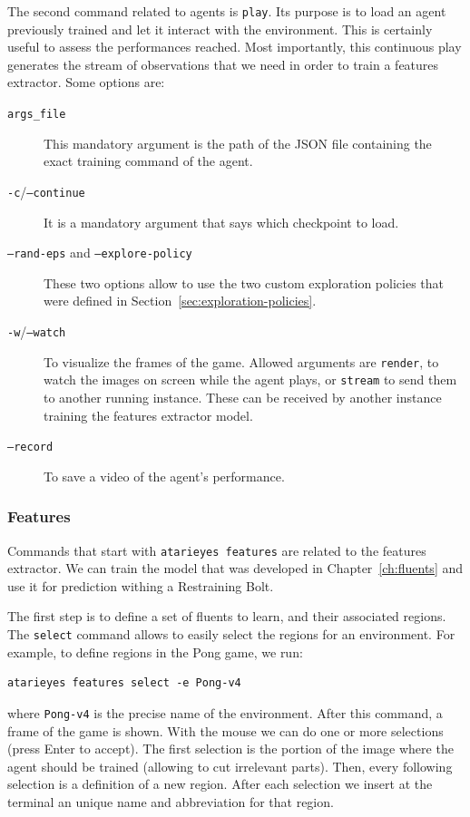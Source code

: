 The second command related to agents is \texttt{play}. Its purpose is to load
an agent previously trained and let it interact with the environment. This is
certainly useful to assess the performances reached. Most importantly, this
continuous play generates the stream of observations that we need in order to
train a features extractor. Some options are:
\begin{description}
	\item [\texttt{args\_file}] This mandatory argument is the path of the JSON
		file containing the exact training command of the agent.
	\item [\texttt{-c}/\texttt{--continue}] It is a mandatory argument that
		says which checkpoint to load.
	\item [\texttt{--rand-eps} {\normalfont and} \texttt{--explore-policy}]
		These two options allow to use the two custom exploration policies that
		were defined in Section~\ref{sec:exploration-policies}.
	\item [\texttt{-w}/\texttt{--watch}] To visualize the frames of the game.
		Allowed arguments are \texttt{render}, to watch the images on screen while
		the agent plays, or \texttt{stream} to send them to another running
		instance. These can be received by another instance training the
		features extractor model.
	\item [\texttt{--record}] To save a video of the agent's performance.
\end{description}


\subsubsection*{Features}

Commands that start with \texttt{atarieyes features} are related to the
features extractor. We can train the model that was developed in
Chapter~\ref{ch:fluents} and use it for prediction withing a
Restraining Bolt.

The first step is to define a set of fluents to learn, and their associated
regions. The \texttt{select} command allows to easily select the regions for
an environment. For example, to define regions in the Pong game, we run:
\begin{lstlisting}[style=bash]
	atarieyes features select -e Pong-v4
\end{lstlisting}
where \texttt{Pong-v4} is the precise name of the environment. After this
command, a frame of the game is shown. With the mouse we can do one or more
selections (press Enter to accept). The first selection is the portion of the
image where the agent should be trained (allowing to cut irrelevant parts).
Then, every following selection is a definition of a new region. After each
selection we insert at the terminal an unique name and abbreviation for that
region.

